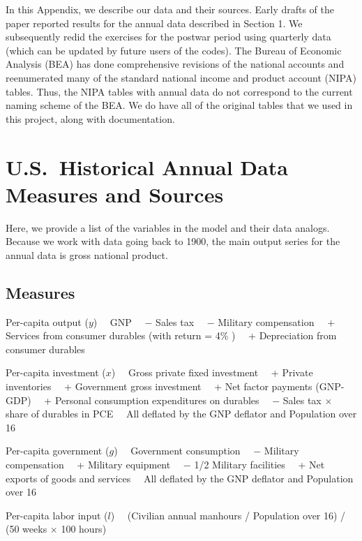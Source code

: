 
\noindent
In this Appendix, we describe our data and their
sources.  Early drafts of the paper reported 
results for the annual data described in Section 1.
We subsequently redid the exercises for the postwar
period using quarterly data (which can be updated
by future users of the codes).  The Bureau of 
Economic Analysis (BEA) has done comprehensive revisions
of the national accounts and reenumerated many of the 
standard national income and product account (NIPA) 
tables.  Thus, the NIPA tables with
annual data do not correspond to the current
naming scheme of the BEA.  We do have all of
the original tables that we used in this project,
along with documentation.

\section{U.S.~Historical Annual Data Measures and Sources}

Here, we provide a list of the variables in the 
model and their data analogs.  Because we work
with data going back to 1900, the main output series 
for the annual data is gross national product.

\subsection{Measures}

\item{\bul} Per-capita output ($y$)
\itemitem{    } \ \ GNP 
\itemitem{    } \ \ $-$ Sales tax 
\itemitem{    } \ \ $-$ Military compensation
\itemitem{    } \ \ $+$ Services from consumer durables (with return = 4\% )
\itemitem{    } \ \ + Depreciation from consumer durables
\bigskip
\item{\bul} Per-capita investment ($x$)
\itemitem{    } \ \ Gross private fixed investment
\itemitem{    } \ \ + Private inventories 
\itemitem{    } \ \ + Government gross investment
\itemitem{    } \ \ + Net factor payments (GNP-GDP)
\itemitem{    } \ \ + Personal consumption expenditures on durables
\itemitem{    } \ \ $-$ Sales tax $\times$ share of durables in PCE
\itemitem{    } \ \ All deflated by the GNP deflator and Population over 16
\bigskip
\item{\bul} Per-capita government ($g$)
\itemitem{    } \ \ Government consumption
\itemitem{    } \ \ $-$ Military compensation
\itemitem{    } \ \ +   Military equipment
\itemitem{    } \ \ $-$ 1/2  Military facilities
\itemitem{    } \ \ + Net exports of goods and services
\itemitem{    } \ \ All deflated by the GNP deflator and Population over 16
\bigskip
\item{\bul} Per-capita labor input ($l$)
\itemitem{    } \ \ (Civilian annual manhours / Population over 16)
                       / (50 weeks $\times$ 100 hours)

